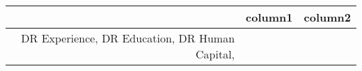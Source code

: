 \documentclass[12pt,landscape]{article}
\newcommand{\graph}[3]{
\raisebox{-#1mm}{\texttt{[image: \#3]}}
}
\begin{document}
\begin{table}[ht]
\centering
\begin{tabular}{rll}
  \hline
 & column1 & column2 \\ 
  \hline
DR Experience, %
  DR Education, %
  DR Human Capital, %
  \\ 
   \hline
\end{tabular}
\end{table}
\end{document}
